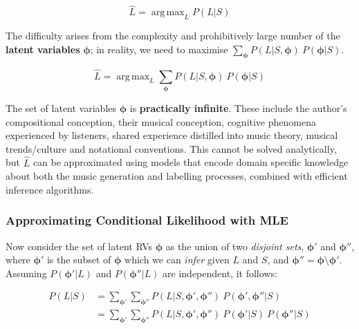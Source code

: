 \documentclass[12pt,a4paper,twoside,openright]{report} \usepackage[pdfborder={0 0 0}]{hyperref}    %
\DeclareMathOperator*{\argmax}{arg\,max} \DeclareMathOperator*{\argmin}{arg\,min}
\theoremstyle{definition} \newtheorem{definition}{Definition}[section]
\begin{document}
      \begin{equation} \hat L = \argmax_L P\left(L|S\right) \label{eq:aceProbSol} \end{equation}

      The difficulty arises from the complexity and prohibitively large number of the \textbf{latent variables} $\bm{
      \phi }$; in reality, we need to maximise $\sum\limits_{\bm{\phi}}P(L|S,\bm{ \phi })~P(\bm{\phi}|S)$.

      \begin{equation} \hat L = \argmax_L \sum\limits_{\bm{\phi}} P(L | S,\bm{\phi})~P(\bm{\phi}|S)
      \label{eq:aceProbSolLatent} \end{equation}

      The set of latent variables $\bm{\phi}$ is \textbf{practically infinite}. These include the author's compositional
      conception, their musical conception, cognitive phenomena experienced by listeners, shared experience distilled
      into music theory, musical trends/culture and notational conventions. This cannot be solved analytically, but
      $\hat{L}$ can be approximated using models that encode domain specific knowledge about both the music generation
      and labelling processes, combined with efficient inference algorithms. 

      \subsubsection{Approximating Conditional Likelihood with MLE}

      Now consider the set of latent RVs $\bm{\phi}$ as the union of two \textit{disjoint sets}, $\bm{\phi'}$ and
      $\bm{\phi''}$, where $\bm{\phi'}$ is the subset of $\bm{\phi}$ which we can \textit{infer} given $L$ and $S$, and
      $\bm{\phi''} = \bm{\phi} \setminus \bm{\phi}'$. Assuming $P(\bm{\phi'} | L)$ and $P(\bm{\phi''} | L)$ are
      independent, it follows:

      \begin{equation} \begin{aligned} P(L|S) &= \sum\limits_{\bm{\phi'}}\sum\limits_{\bm{\phi''}} P(L
      | S,\bm{\phi'},\bm{ \phi'' })~P(\bm{ \phi' }, \bm{ \phi'' } |S) \\ &=
    \sum\limits_{\bm{\phi'}}\sum\limits_{\bm{\phi''}} P(L | S,\bm{\phi'},\bm{\phi''})~P(\bm{\phi'} | S)~P(\bm{\phi''}
  |S) \end{aligned}
\label{eq:aceProbSolLatent} \end{equation}
\end{document}
